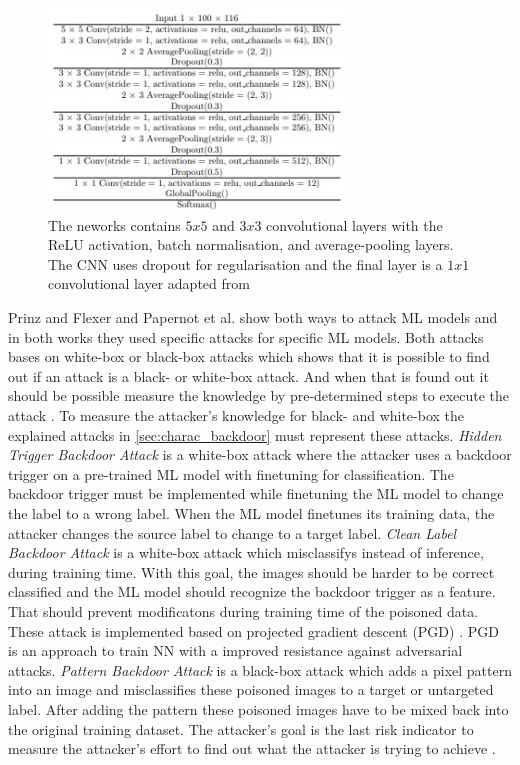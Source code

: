 \begin{figure}[ht!]
  \centering
  \includegraphics[width=8cm]{pictures/cnn_whitebox.jpg}
  \caption{The neworks contains $5x5$ and $3x3$ convolutional layers with the ReLU activation, batch normalisation, and average-pooling layers. The CNN uses dropout for regularisation and the final layer is a $1x1$ convolutional layer adapted from \cite{DBLP:journals/corr/abs-2007-14714}}
  \label{fig:cnn_whitebox}
\end{figure}

Prinz and Flexer \cite{DBLP:journals/corr/abs-2007-14714} and Papernot et al. \cite{DBLP:conf/ccs/PapernotMGJCS17} show both ways to attack ML models and in both works they used specific attacks for specific ML models. Both attacks bases on white-box or black-box attacks which shows that it is possible to find out if an attack is a black- or white-box attack. And when that is found out it should be possible measure the knowledge by pre-determined steps to execute the attack \cite{bsi_2013}. To measure the attacker's knowledge for black- and white-box the explained attacks in \ref{sec:charac_backdoor} must represent these attacks. \textit{Hidden Trigger Backdoor Attack} \cite{DBLP:journals/corr/abs-1910-00033} is a white-box attack where the attacker uses a backdoor trigger on a pre-trained ML model with finetuning for classification. The backdoor trigger must be implemented while finetuning the ML model to change the label to a wrong label. When the ML model finetunes its training data, the attacker changes the source label to change to a target label. \textit{Clean Label Backdoor Attack} \cite{turner2018clean} is a white-box attack which misclassifys instead of inference, during training time. With this goal, the images should be harder to be correct classified and the ML model should recognize the backdoor trigger as a feature. That should prevent modificatons during training time of the poisoned data. These attack is implemented based on projected gradient descent (PGD) \cite{DBLP:journals/corr/MadryMSTV17}. PGD is an approach to train NN with
a improved resistance against adversarial attacks. \textit{Pattern Backdoor Attack} \cite{DBLP:journals/corr/abs-1708-06733} is a black-box attack which adds a pixel pattern into an image and misclassifies these poisoned images to a target or untargeted label. After adding the pattern these poisoned images have to be mixed back into the original training dataset. The attacker's goal is the last risk indicator to measure the attacker's effort to find out what the attacker is trying to achieve \cite{DBLP:journals/corr/abs-2012-04884}.

